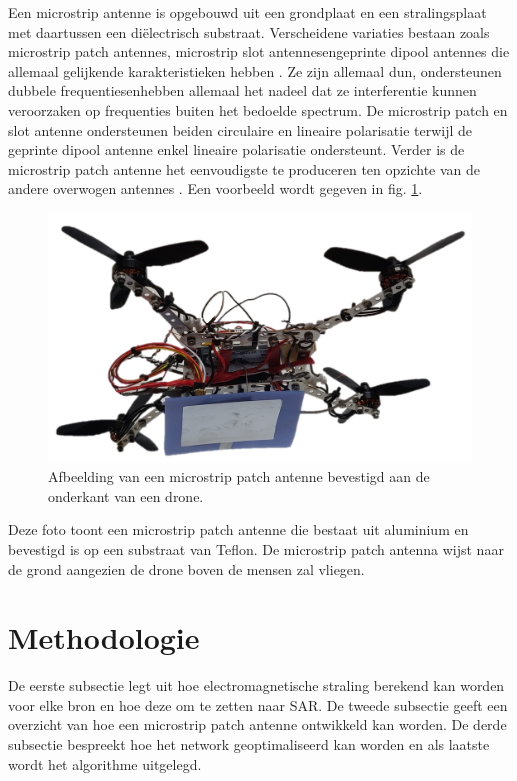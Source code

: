 \documentclass[twocolumn]{phdsymp_dutch}
\begin{document}
Een microstrip antenne is opgebouwd uit een grondplaat en een stralingsplaat met daartussen een di\"electrisch substraat.
Verscheidene variaties bestaan zoals microstrip patch antennes, microstrip slot antennesengeprinte dipool antennes 
die allemaal gelijkende karakteristieken hebben \cite{J13_microstripadvantages,J14_antennadesign}. 
Ze zijn allemaal dun, ondersteunen dubbele frequentiesenhebben allemaal het nadeel dat 
ze interferentie kunnen veroorzaken op frequenties buiten het bedoelde spectrum. 
De microstrip patch en slot antenne ondersteunen beiden circulaire en lineaire polarisatie terwijl de geprinte dipool antenne enkel 
lineaire polarisatie ondersteunt. Verder is de microstrip patch antenne het eenvoudigste te produceren ten opzichte 
van de andere overwogen antennes \cite{J13_microstripadvantages}. Een voorbeeld wordt gegeven in fig. \ref{fig:exampleDrone}.

\begin{figure}[h]
\centering
  \includegraphics[width=\linewidth]{drone.png}
  \caption{Afbeelding van een microstrip patch antenne bevestigd aan de onderkant van een drone. }
  \label{fig:exampleDrone}
\end{figure}
\vspace{10 mm}
Deze foto toont een microstrip patch antenne die bestaat 
uit aluminium en bevestigd is op een substraat van Teflon. De microstrip patch antenna 
wijst naar de grond aangezien de drone boven de mensen zal vliegen.

\section{Methodologie}

De eerste subsectie legt uit hoe electromagnetische straling berekend kan worden voor elke bron 
en hoe deze om te zetten naar \gls{SAR}.
De tweede subsectie geeft een overzicht van hoe een microstrip patch antenne ontwikkeld kan worden. 
De derde subsectie bespreekt hoe het network geoptimaliseerd kan worden en als laatste wordt het algorithme
uitgelegd.
\end{document}
